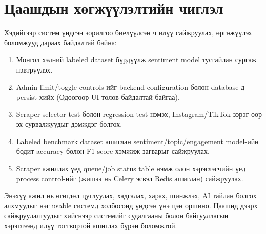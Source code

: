 \section{Цаашдын хөгжүүлэлтийн чиглэл}

Хэдийгээр систем үндсэн зорилгоо биелүүлсэн ч илүү сайжруулах, өргөжүүлэх боломжууд дараах байдалтай байна:
\begin{enumerate}
    \item Монгол хэлний labeled dataset бүрдүүлж sentiment model тусгайлан сургаж нэвтрүүлэх.
    \item Admin limit/toggle controls-ийг backend configuration болон database-д persist хийх (Одоогоор UI төлөв байдалтай байгаа).
    \item Scraper selector test болон regression test нэмэх, Instagram/TikTok зэрэг өөр эх сурвалжуудыг дэмждэг болгох.
    \item Labeled benchmark dataset ашиглан sentiment/topic/engagement model-ийн бодит accuracy болон F1 score хэмжиж загварыг сайжруулах.
    \item Scraper ажиллах үед queue/job status table нэмж олон хэрэглэгчийн үед process control-ийг (жишээ нь Celery эсвэл Redis ашиглан) сайжруулах.
\end{enumerate}

Энэхүү ажил нь өгөгдөл цуглуулах, хадгалах, харах, шинжлэх, AI тайлан болгох алхмуудыг нэг usable системд холбосонд үндсэн үнэ цэн оршино. Цаашид дээрх сайжруулалтуудыг хийснээр системийг судалгааны болон байгууллагын хэрэглээнд илүү тогтвортой ашиглах бүрэн боломжтой.
